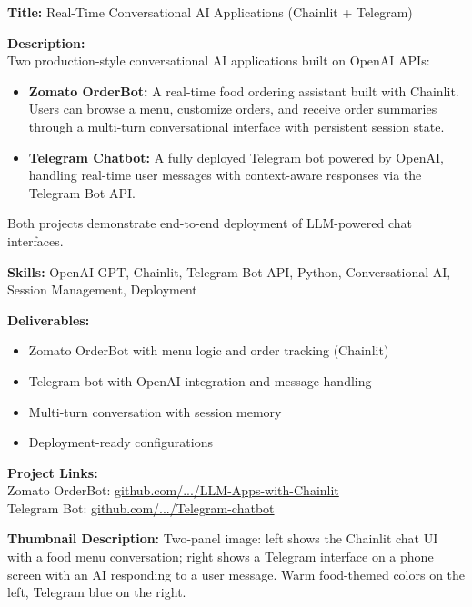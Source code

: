 \documentclass[11pt,a4paper]{article}
\newcommand{\projectentry}[1]{%
  \begin{mdframed}[backgroundcolor=LightGray, linecolor=VividPurple, linewidth=1pt,
    topline=false, bottomline=false, rightline=false,
    innerleftmargin=10pt, innerrightmargin=10pt, innertopmargin=8pt, innerbottommargin=8pt,
    skipabove=8pt, skipbelow=4pt]
  #1
  \end{mdframed}
}
\begin{document}
\projectentry{
\textbf{\textcolor{VividPurple}{Title:}} Real-Time Conversational AI Applications (Chainlit + Telegram)

\medskip
\textbf{\textcolor{VividPurple}{Description:}}\\
Two production-style conversational AI applications built on OpenAI APIs:
\begin{itemize}
  \item \textbf{Zomato OrderBot:} A real-time food ordering assistant built with Chainlit. Users can browse a menu, customize orders, and receive order summaries through a multi-turn conversational interface with persistent session state.
  \item \textbf{Telegram Chatbot:} A fully deployed Telegram bot powered by OpenAI, handling real-time user messages with context-aware responses via the Telegram Bot API.
\end{itemize}
Both projects demonstrate end-to-end deployment of LLM-powered chat interfaces.

\medskip
\textbf{\textcolor{VividPurple}{Skills:}} OpenAI GPT, Chainlit, Telegram Bot API, Python, Conversational AI, Session Management, Deployment

\medskip
\textbf{\textcolor{VividPurple}{Deliverables:}}
\begin{itemize}
  \item Zomato OrderBot with menu logic and order tracking (Chainlit)
  \item Telegram bot with OpenAI integration and message handling
  \item Multi-turn conversation with session memory
  \item Deployment-ready configurations
\end{itemize}

\textbf{\textcolor{VividPurple}{Project Links:}}\\
Zomato OrderBot: \href{https://github.com/adebanjioluwatimileyin/generative-ai-portfolio/blob/main/End-to-End-AI-Applications/LLM-Apps-with-Chainlit}{github.com/.../LLM-Apps-with-Chainlit}\\
Telegram Bot: \href{https://github.com/adebanjioluwatimileyin/generative-ai-portfolio/blob/main/OpenAI-Projects/Telegram-chatbot}{github.com/.../Telegram-chatbot}

\medskip
\textbf{\textcolor{VividPurple}{Thumbnail Description:}} Two-panel image: left shows the Chainlit chat UI with a food menu conversation; right shows a Telegram interface on a phone screen with an AI responding to a user message. Warm food-themed colors on the left, Telegram blue on the right.
}
\end{document}

